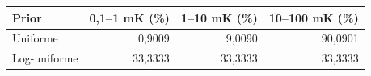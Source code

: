 \begin{tabular}{lrrr}
\toprule
Prior & 0,1–1 mK (\%) & 1–10 mK (\%) & 10–100 mK (\%) \\
\midrule
Uniforme & 0,9009 & 9,0090 & 90,0901 \\
Log-uniforme & 33,3333 & 33,3333 & 33,3333 \\
\bottomrule
\end{tabular}
